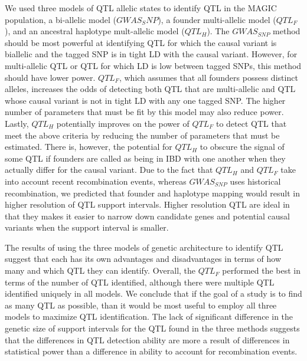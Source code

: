 \documentclass[article,9pt,twocolumn,twoside]{rilabRxiv}
\begin{document}
We used three models of QTL allelic states to identify QTL in the MAGIC population, a bi-allelic model ($GWAS_SNP$), a founder multi-allelic model ($QTL_F$), and an ancestral haplotype mult-allelic model ($QTL_H$).
The $GWAS_{SNP}$ method should be most powerful at identifying QTL for which the causal variant is biallelic and the tagged SNP is in tight LD with the causal variant.
However, for multi-allelic QTL or QTL for which LD is low between tagged SNPs, this method should have lower power.
$QTL_F$, which assumes that all founders possess distinct alleles, increases the odds of detecting both QTL that are multi-allelic and QTL whose causal variant is not in tight LD with any one tagged SNP.
The higher number of parameters that must be fit by this model may also reduce power.
Lastly, $QTL_H$ potentially improves on the power of $QTL_F$ to detect QTL that meet the above criteria by reducing the number of parameters that must be estimated.
There is, however, the potential for $QTL_H$ to obscure the signal of some QTL if founders are called as being in IBD with one another when they actually differ for the causal variant.
Due to the fact that $QTL_H$ and $QTL_F$ take into account recent recombination events, whereas $GWAS_{SNP}$ uses historical recombination, we predicted that founder and haplotype mapping would result in higher resolution of QTL support intervals. Higher resolution QTL are ideal in that they makes it easier to narrow down candidate genes and potential causal variants when the support interval is smaller.


The results of using the three models of genetic architecture to identify QTL suggest that each has its own advantages and disadvantages in terms of how many and which QTL they can identify.
Overall, the $QTL_F$ performed the best in terms of the number of QTL identified, although there were multiple QTL identified uniquely in all models.
We conclude that if the goal of a study is to find as many QTL as possible, than it would be most useful to employ all three models to maximize QTL identification.
The lack of significant difference in the genetic size of support intervals for the QTL found in the three methods suggests that the differences in QTL detection ability are more a result of differences in statistical power than a difference in ability to account for recombination events.
\end{document}
